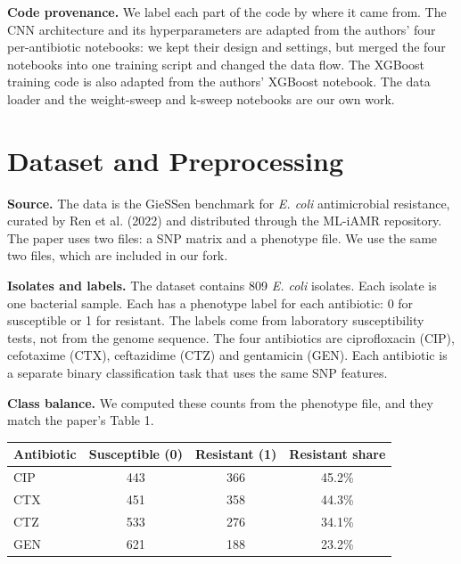 \documentclass[11pt]{article}
\begin{document}
\textbf{Code provenance.} We label each part of the code by where it came from. The CNN architecture and its hyperparameters are adapted from the authors' four per-antibiotic notebooks: we kept their design and settings, but merged the four notebooks into one training script and changed the data flow. The XGBoost training code is also adapted from the authors' XGBoost notebook. The data loader and the weight-sweep and k-sweep notebooks are our own work.

\section{Dataset and Preprocessing}

\textbf{Source.} The data is the GieSSen benchmark for \textit{E. coli} antimicrobial resistance, curated by Ren et al. (2022) and distributed through the ML-iAMR repository. The paper uses two files: a SNP matrix and a phenotype file. We use the same two files, which are included in our fork.

\textbf{Isolates and labels.} The dataset contains 809 \textit{E. coli} isolates. Each isolate is one bacterial sample. Each has a phenotype label for each antibiotic: 0 for susceptible or 1 for resistant. The labels come from laboratory susceptibility tests, not from the genome sequence. The four antibiotics are ciprofloxacin (CIP), cefotaxime (CTX), ceftazidime (CTZ) and gentamicin (GEN). Each antibiotic is a separate binary classification task that uses the same SNP features.

\textbf{Class balance.} We computed these counts from the phenotype file, and they match the paper's Table 1.

\begin{center}
\begin{tabular}{lccc}
\toprule
\textbf{Antibiotic} & \textbf{Susceptible (0)} & \textbf{Resistant (1)} & \textbf{Resistant share} \\
\midrule
CIP & 443 & 366 & 45.2\% \\
CTX & 451 & 358 & 44.3\% \\
CTZ & 533 & 276 & 34.1\% \\
GEN & 621 & 188 & 23.2\% \\
\bottomrule
\end{tabular}
\end{center}
\end{document}
